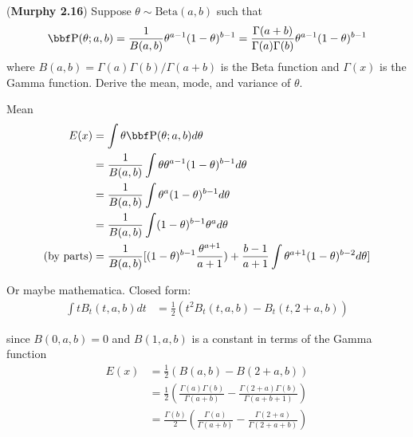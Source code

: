 \documentclass[12pt,letterpaper,fleqn]{hmcpset}
\begin{document}
\begin{problem}[1]
(\textbf{Murphy 2.16}) Suppose $\theta \sim \text{Beta}(a,b)$ such
        that
        \[
            \PP(\theta; a,b) = \frac{1}{B(a,b)} \theta^{a-1}(1-\theta)^{b-1} = \frac{\Gamma(a+b)}{\Gamma(a)\Gamma(b)} \theta^{a-1}(1-\theta)^{b-1}
        \]
        where $B(a,b) = \Gamma(a)\Gamma(b)/\Gamma(a+b)$ is the Beta function
        and $\Gamma(x)$ is the Gamma function.
        Derive the mean, mode, and variance of $\theta$.
\end{problem}
\begin{solution}

\item Mean
\begin{equation}\begin{aligned}
E(x) & = \int \theta \PP(\theta; a,b) d\theta \\
& = \frac{1}{B(a,b)} \int \theta \theta^{a-1}(1-\theta)^{b-1} d\theta \\
& = \frac{1}{B(a,b)} \int \theta^a(1-\theta)^{b-1} d\theta \\
& = \frac{1}{B(a,b)} \int (1-\theta)^{b-1} \theta^a d\theta \\
\text{(by parts)} & = \frac{1}{B(a,b)} [ (1-\theta)^{b-1} \frac{\theta^{a+1}}{a + 1} ) + \frac{b-1}{a+1} \int \theta^{a+1} (1-\theta)^{b-2} d\theta ] \\
\end{aligned}\end{equation}    

Or maybe mathematica.  Closed form:
\begin{equation}\begin{aligned}
\int t B_t(t,a,b) dt & = \frac{1}{2} (t^2 B_t(t, a, b) - B_t(t, 2 + a, b) )
\end{aligned}\end{equation}

since $B(0,a,b) = 0$ and $B(1,a,b)$ is a constant in terms of the Gamma function
\begin{equation}\begin{aligned}
E(x) & = \frac{1}{2} ( B(a, b) - B(2 + a, b) ) \\
& = \frac{1}{2} ( \frac{\Gamma(a)\Gamma(b)}{\Gamma(a+b)} - \frac{\Gamma(2 + a)\Gamma(b)}{\Gamma(a+b + 1)} ) \\
& = \frac{\Gamma(b)}{2} ( \frac{\Gamma(a)}{\Gamma(a+b)} - \frac{\Gamma(2+a)}{\Gamma(2+a+b)} )
\end{aligned}\end{equation}


\end{solution}
\end{document}
